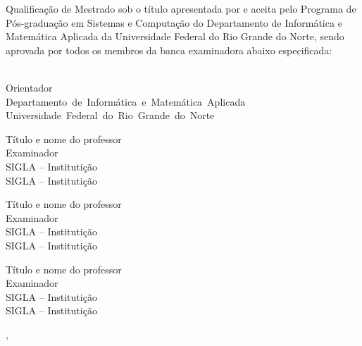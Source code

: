 


	
	\noindent 
	Qualificação de Mestrado sob o título \textit{ \Titulo } apresentada por \Autor{} e aceita pelo Programa de Pós-graduação em Sistemas e Computação do Departamento de Informática e Matemática Aplicada da Universidade Federal do Rio Grande do Norte, sendo aprovada por todos os membros da banca examinadora abaixo especificada:
		
\begin{center}
    \assinatura
	{
		{\Orientador}\\
        {\small Orientador}	\\
		{\footnotesize
			\mbox{Departamento de Informática e Matemática Aplicada}\\ 
		  	\mbox{Universidade Federal do Rio Grande do Norte}
		}
   }
\end{center}
\begin{center}
    \assinatura
	{
		Título e nome do professor  			                  \\
		{\small Examinador}											          \smallskip\\ 
		{\footnotesize
			SIGLA -- Institutição		   \\
		  	SIGLA -- Institutição
		}
   }   
\end{center}
\begin{center}
    \assinatura
	{
		Título e nome do professor  			                  \\
		{\small Examinador}											          \smallskip\\ 
	    {\footnotesize
			SIGLA -- Institutição		   \\
		  	SIGLA -- Institutição
		}
	}
\end{center}
\begin{center}
    \assinatura
	{
		Título e nome do professor  			                  \\
		{\small Examinador}											          \smallskip\\ 
		{\footnotesize
			SIGLA -- Institutição		   \\
		  	SIGLA -- Institutição
		}
	}
\end{center} 
	\vfill
	
	\begin{center}
		\Local{}, \DataDaAprovacao{}
	\end{center}

